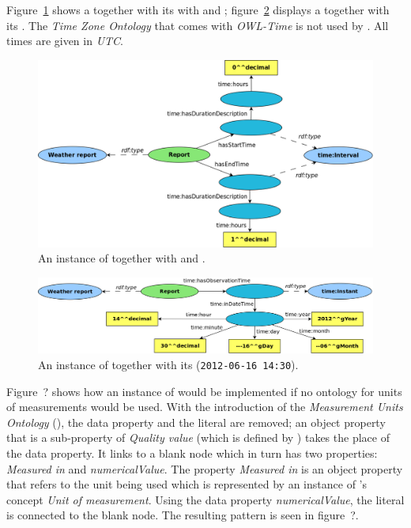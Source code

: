 Figure~\ref{fig:owl_time1} shows a  together with its with  and ; figure~\ref{fig:owl_time2} displays a  together with its . The \emph{Time Zone Ontology} that comes with \emph{OWL-Time} is not used by \thinkhomeweather. All times are given in \emph{UTC}.

\begin{figure}
  \includegraphics[width=\textwidth]{figures/diagrams/owl-time1.png}
  \caption{An instance of  together with  and .}
  \label{fig:owl_time1}
\end{figure}

\begin{figure}
  \includegraphics[width=\textwidth]{figures/diagrams/owl-time2.png}
  \caption{An instance of  together with its  (\texttt{2012-06-16~14:30}).}
  \label{fig:owl_time2}
\end{figure}

\vspace{1em}

Figure~? shows how an instance of  would be implemented if no ontology for units of measurements would be used. With the introduction of the \emph{Measurement Units Ontology} (\muo), the data property and the literal are removed; an object property that is a sub-property of \emph{Quality value} (which is defined by \muo) takes the place of the data property. It links to a blank node which in turn has two properties: \emph{Measured in} and \emph{numericalValue}. The property \emph{Measured in} is an object property that refers to the unit being used which is represented by an instance of \muo's concept \emph{Unit of measurement}. Using the data property \emph{numericalValue}, the literal is connected to the blank node. The resulting pattern is seen in figure~?. %

